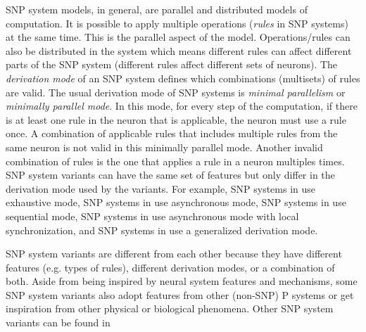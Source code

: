 \documentclass[smallextended]{svjour3}
\begin{document}
SNP system models, in general, are parallel and distributed models of computation. It is possible to
apply multiple operations (\emph{rules} in SNP systems) at the same time. This is the parallel
aspect of the model. Operations/rules can also be distributed in the system which means different
rules can affect different parts of the SNP system (different rules affect different sets of 
neurons). The \emph{derivation mode} of an SNP system defines which combinations (multisets) of 
rules are valid. The usual derivation mode of SNP systems is \emph{minimal parallelism} or
\emph{minimally parallel mode}. In this mode, for every step of the computation, if there is at 
least one rule in the neuron that is applicable, the neuron must use a rule once. A combination of
applicable rules that includes multiple rules from the same neuron is not valid in this 
minimally parallel mode. Another invalid combination of rules is the one that applies a rule in
a neuron multiples times. SNP system variants can have the same set of features but only differ in
the derivation mode used by the variants. For example, SNP systems in \cite{ionescu-2007-exhaustive}
use exhaustive mode, SNP systems in \cite{cavaliere-2009-asynchronous} use asynchronous mode, SNP
systems in \cite{ibarra-2009-min-max-sequential} use sequential mode, SNP systems in \cite{song-2013-local-sync}
use asynchronous mode with local synchronization, and SNP systems in  
\cite{zhang-2014-general-rule-use,jiang-2019-improved-usnp-general-rule-use} use a generalized 
derivation mode.

SNP system variants are different from each other because they have different features (e.g. types of rules),
different derivation modes, or a combination of both. Aside from being inspired by neural system 
features and mechanisms, some SNP system variants also adopt features from other (non-SNP) P 
systems or get inspiration from other physical or biological phenomena. Other SNP system variants 
can be found in   
 \cite{chen-2008-snp-e,alhazov-2006-esnp,chen-2007-axon-p,pan-2009-anti-spikes,song-2014-rules-on-synapses,metta-2014-cooperating-rules,wu-2016-cell-like,song-2016-request-rules,song-2016-white-hole-neurons,peng-2017-multiple-channels,pan-2017-communication-on-request,song-2018-colored-spikes}
\end{document}
